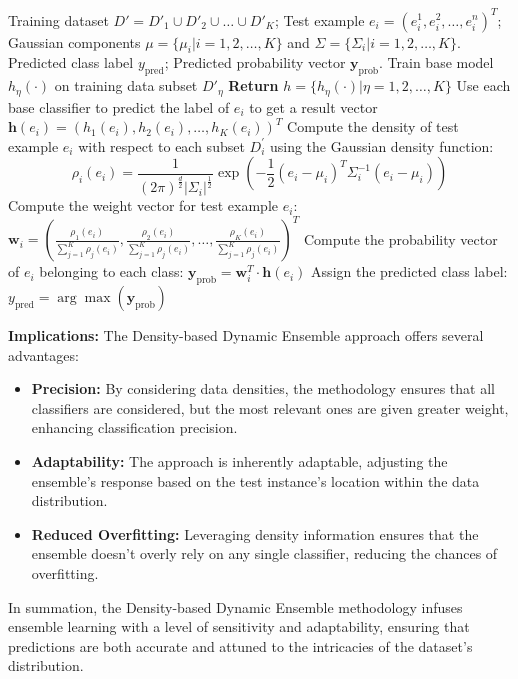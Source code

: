 \documentclass[lettersize,journal]{IEEEtran}
\begin{document}
	\begin{algorithm}[H]
		\caption{The density-based dynamic ensemble for multi-class classification.}
		\label{algo:density-based-dynamic-ensemble}
		\begin{algorithmic}[1]
			\Require Training dataset $D' = D'_1 \cup D'_2 \cup \dots \cup D'_K$; Test example $e_i = (e_i^1, e_i^2, \dots, e_i^n)^T$; Gaussian components $\mu = \{\mu_i | i = 1, 2, \dots, K\}$ and $\Sigma = \{\Sigma_i | i = 1, 2, \dots, K\}$.
			\Ensure Predicted class label $y_{\text{pred}}$; Predicted probability vector $\mathbf{y}_{\text{prob}}$.
			\State Train base model $h_\eta(\cdot)$ on training data subset $D'_\eta$
			\EndFor
			\State \textbf{Return} $h = \{h_\eta(\cdot) | \eta = 1, 2, \dots, K\}$
			\EndProcedure
			\State Use each base classifier to predict the label of $e_i$ to get a result vector $\mathbf{h}(e_i) = (h_1(e_i), h_2(e_i), \dots, h_K(e_i))^T$
			\State Compute the density of test example $e_i$ with respect to each subset $D_i^{\prime}$ using the Gaussian density function:
			\begin{equation*}
				\rho_i(e_i) = \frac{1}{(2 \pi)^{\frac{d}{2}} |\Sigma_i|^{\frac{1}{2}}} \exp \left(-\frac{1}{2}(e_i-\mu_i)^T \Sigma_i^{-1} (e_i-\mu_i)\right)
			\end{equation*}
			\State Compute the weight vector for test example $e_i$: $\mathbf{w}_i = \left(\frac{\rho_1(e_i)}{\sum_{j=1}^{K} \rho_j(e_i)}, \frac{\rho_2(e_i)}{\sum_{j=1}^{K} \rho_j(e_i)}, \dots, \frac{\rho_K(e_i)}{\sum_{j=1}^{K} \rho_j(e_i)}\right)^T$
			\State Compute the probability vector of $e_i$ belonging to each class: $\mathbf{y}_{\text{prob}} = \mathbf{w}_i^T \cdot \mathbf{h}(e_i)$
			\State Assign the predicted class label:\\
			$y_{\text{pred}} = \arg\max(\mathbf{y}_{\text{prob}})$
			\EndProcedure
		\end{algorithmic}
	\end{algorithm}
	
	\textbf{Implications:} The Density-based Dynamic Ensemble approach offers several advantages:
	
	\begin{itemize}
		\item \textbf{Precision:} By considering data densities, the methodology ensures that all classifiers are considered, but the most relevant ones are given greater weight, enhancing classification precision.
		\item \textbf{Adaptability:} The approach is inherently adaptable, adjusting the ensemble’s response based on the test instance’s location within the data distribution.
		\item \textbf{Reduced Overfitting:} Leveraging density information ensures that the ensemble doesn’t overly rely on any single classifier, reducing the chances of overfitting.
	\end{itemize}
	In summation, the Density-based Dynamic Ensemble methodology infuses ensemble learning with a level of sensitivity and adaptability, ensuring that predictions are both accurate and attuned to the intricacies of the
	dataset’s distribution.
	
\end{document}
